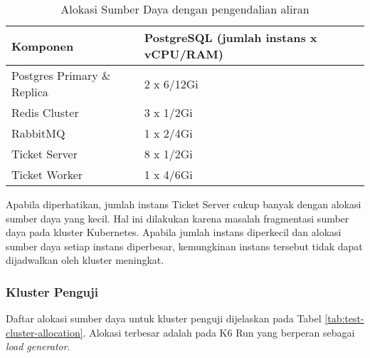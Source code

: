 \begin{table}[H]
    \centering
    \caption{Alokasi Sumber Daya dengan pengendalian aliran}
    \label{tab:service_comparison_fc}
    \begin{tabular}{|l|l|}
        \hline
        \textbf{Komponen}           & \textbf{PostgreSQL (jumlah instans x vCPU/RAM)} \\ \hline
        Postgres Primary \& Replica & 2 x 6/12Gi                                      \\ \hline
        Redis Cluster               & 3 x 1/2Gi                                       \\ \hline
        RabbitMQ                    & 1 x 2/4Gi                                       \\ \hline
        Ticket Server               & 8 x 1/2Gi                                       \\ \hline
        Ticket Worker               & 1 x 4/6Gi                                       \\ \hline
    \end{tabular}
\end{table}

Apabila diperhatikan, jumlah instans Ticket Server cukup banyak dengan alokasi sumber daya yang kecil. Hal ini dilakukan karena masalah fragmentasi sumber daya pada kluster Kubernetes. Apabila jumlah instans diperkecil dan alokasi sumber daya setiap instans diperbesar, kemungkinan instans tersebut tidak dapat dijadwalkan oleh kluster meningkat.

\subsubsection{Kluster Penguji}

Daftar alokasi sumber daya untuk kluster penguji dijelaskan pada Tabel \ref{tab:test-cluster-allocation}. Alokasi terbesar adalah pada K6 Run yang berperan sebagai \textit{load generator}.

